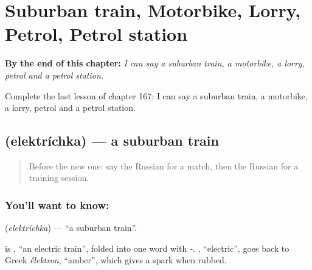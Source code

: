 
\chapter{Suburban train, Motorbike, Lorry, Petrol, Petrol station}
\label{ch:ru-suburban-train-motorbike-lorry-petrol-petrol-station}

\begin{chapteropening}
\textbf{By the end of this chapter:} \emph{I can say a suburban train, a motorbike, a lorry, petrol and a petrol station.}

Complete the last lesson of chapter 167: I can say a suburban train, a motorbike, a lorry, petrol and a petrol station.
\end{chapteropening}

\section[\texorpdfstring{\ru{электричка} (elektríchka)}{электричка (elektríchka)}]{ (elektríchka) — a suburban train}

\label{lesson:RU-C167-elektrichka}



\begin{quote}
Before the new one: say the Russian for a match, then the Russian for a training session.
\end{quote}

\subsection*{You'll want to know: }
\textbf{} (\emph{elektríchka}) — \textquotedblleft{}a suburban train\textquotedblright{}.

\begin{cousinweb}
\textbf{} is \emph{ }, \textquotedblleft{}an electric train\textquotedblright{}, folded into one word with \emph{-}. \emph{}, \textquotedblleft{}electric\textquotedblright{}, goes back to Greek \emph{\'{\={e}}lektron}, \textquotedblleft{}amber\textquotedblright{}, which gives a spark when rubbed.
\end{cousinweb}

